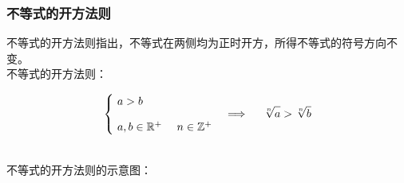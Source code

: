 \documentclass[UTF8]{ctexart}
\begin{document}
\subsubsection{不等式的开方法则}
    不等式的开方法则指出，不等式在两侧均为正时开方，所得不等式的符号方向不变。\\[3mm]
    不等式的开方法则：
    \begin{large}
        \begin{align*}
            \begin{cases}
                ~a>b\\[3mm]
                ~a,b\in\mathbb{R^+}~~~~n\in\mathbb{Z^+}
            \end{cases}
            \Longrightarrow~~~~\sqrt[n]{\vphantom{b}a}>\sqrt[n]{b}
        \end{align*}
    \end{large}\\[3mm]
    不等式的开方法则的示意图：
\end{document}
